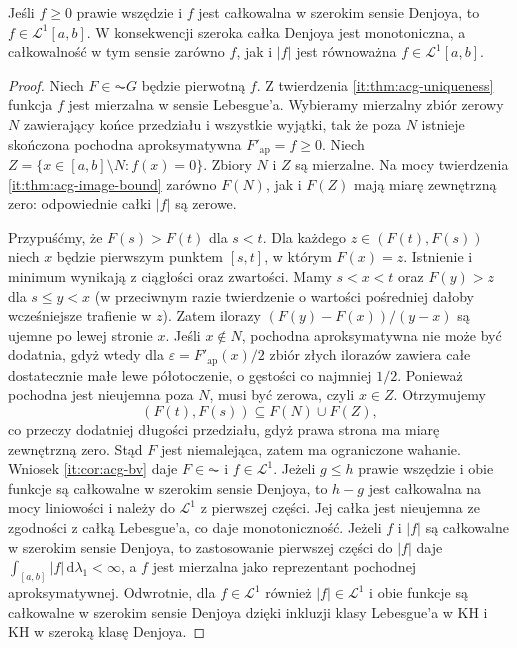 \begin{twierdzenie}\label{ma1:kh:thm:wide-denjoy-positive}
Jeśli $f\ge0$ prawie wszędzie i $f$ jest całkowalna w szerokim sensie Denjoya, to $f\in\mathcal L^1[a,b]$. W konsekwencji szeroka całka Denjoya jest monotoniczna, a całkowalność w tym sensie zarówno $f$, jak i $|f|$ jest równoważna $f\in\mathcal L^1[a,b]$.
\end{twierdzenie}
\begin{proof}
Niech $F\in\AC G$ będzie pierwotną $f$. Z twierdzenia
\ref{it:thm:acg-uniqueness} funkcja $f$ jest mierzalna
w sensie Lebesgue'a. Wybieramy mierzalny zbiór zerowy $N$
zawierający końce przedziału i wszystkie wyjątki, tak że
poza $N$ istnieje skończona pochodna aproksymatywna
$F'_{\mathrm{ap}}=f\ge0$. Niech
$Z=\{x\in[a,b]\setminus N:f(x)=0\}$.
Zbiory $N$ i $Z$ są mierzalne. Na mocy twierdzenia
\ref{it:thm:acg-image-bound} zarówno $F(N)$, jak i $F(Z)$
mają miarę zewnętrzną zero: odpowiednie całki $|f|$
są zerowe.

Przypuśćmy, że $F(s)>F(t)$ dla $s<t$. Dla każdego $z\in(F(t),F(s))$ niech $x$ będzie pierwszym punktem $[s,t]$, w którym $F(x)=z$. Istnienie i minimum wynikają z ciągłości oraz zwartości. Mamy $s<x<t$ oraz $F(y)>z$ dla $s\le y<x$ (w przeciwnym razie twierdzenie o wartości pośredniej dałoby wcześniejsze trafienie w $z$). Zatem ilorazy $(F(y)-F(x))/(y-x)$ są ujemne po lewej stronie $x$. Jeśli $x\notin N$, pochodna aproksymatywna nie może być dodatnia, gdyż wtedy dla $\varepsilon=F'_{\mathrm{ap}}(x)/2$ zbiór złych ilorazów zawiera całe dostatecznie małe lewe półotoczenie, o gęstości co najmniej $1/2$. Ponieważ pochodna jest nieujemna poza $N$, musi być zerowa, czyli $x\in Z$. Otrzymujemy
\[
 (F(t),F(s))\subseteq F(N)\cup F(Z),
\]
co przeczy dodatniej długości przedziału, gdyż prawa strona ma miarę zewnętrzną zero. Stąd $F$ jest niemalejąca, zatem ma ograniczone wahanie. Wniosek \ref{it:cor:acg-bv} daje $F\in\AC$ i $f\in\mathcal L^1$. Jeżeli $g\le h$ prawie wszędzie i obie funkcje są całkowalne w szerokim sensie Denjoya, to $h-g$ jest całkowalna na mocy liniowości i należy do $\mathcal L^1$ z pierwszej części. Jej całka jest nieujemna ze zgodności z całką Lebesgue'a, co daje monotoniczność. Jeżeli $f$ i $|f|$ są całkowalne w szerokim sensie Denjoya, to zastosowanie pierwszej części do $|f|$ daje $\int_{[a,b]}|f|\,\mathrm d\lambda_1<\infty$, a $f$ jest mierzalna jako reprezentant pochodnej aproksymatywnej. Odwrotnie, dla $f\in\mathcal L^1$ również $|f|\in\mathcal L^1$ i obie funkcje są całkowalne w szerokim sensie Denjoya dzięki inkluzji klasy Lebesgue'a w KH i KH w szeroką klasę Denjoya.
\end{proof}
